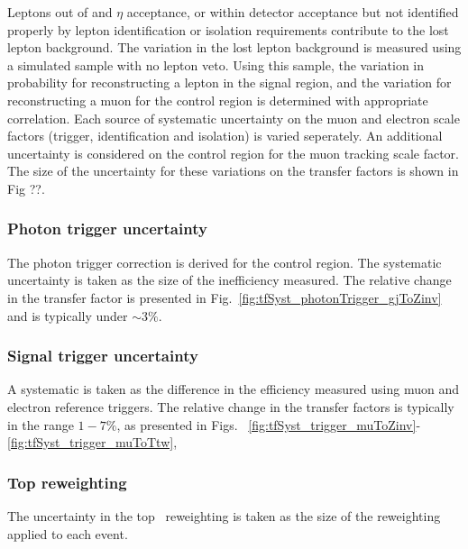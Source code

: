 Leptons out of \pt and $\eta$ acceptance, or within detector
acceptance but not identified properly by lepton identification or isolation
requirements contribute to the lost lepton background. The variation 
in the lost lepton background is measured using a simulated sample with no lepton veto.
Using this sample, the variation in probability for reconstructing a lepton in the signal region,
and the variation for reconstructing a muon for the \mj control region is determined with 
appropriate correlation. Each source of systematic uncertainty 
on the muon and electron scale factors (trigger, identification and isolation) is varied seperately. 
An additional uncertainty is considered on the \mj control region for the muon tracking
scale factor. The size of the uncertainty for these variations on the transfer factors is 
shown in Fig ??.

\subsubsection{Photon trigger uncertainty}
\label{sec:tfSyst_pho}
The photon trigger correction is derived for the \gj control region. The systematic uncertainty is
taken as the size of the inefficiency measured. The relative change in the \gj transfer factor 
is presented in Fig.~\ref{fig:tfSyst_photonTrigger_gjToZinv} and is typically under $\sim3\%$.

\subsubsection{Signal trigger uncertainty}
\label{sec:tfSyst_trigger}

A systematic is taken as the difference in the efficiency measured using muon and 
electron reference triggers. The relative change in the transfer factors is typically in the range
$1-7\%$, as presented in Figs.
~\ref{fig:tfSyst_trigger_muToZinv}-\ref{fig:tfSyst_trigger_muToTtw}, 
\subsubsection{Top \pt reweighting}

The uncertainty in the top \pt~reweighting is taken as the size of the reweighting
applied to each event.

